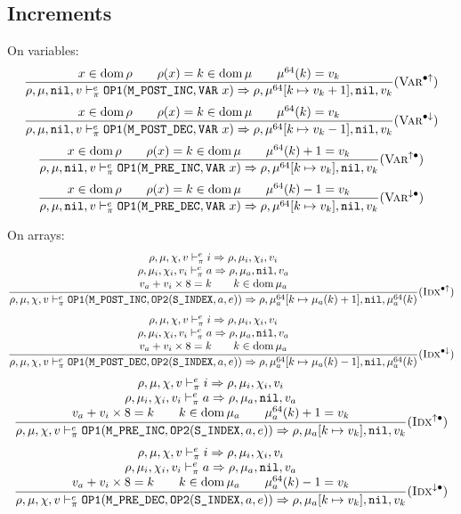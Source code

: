 \subsection{Increments}
On variables:
\[\dfrac{
    x\in\operatorname{dom}\rho \qquad \rho(x) = k \in\operatorname{dom}\mu \qquad \mu^{64}(k) = v_k
}{\rho,\mu,\texttt{nil},v \vdash_\pi^e \texttt{OP1}(\texttt{M\_POST\_INC}, \texttt{VAR}\ x) \Rightarrow \rho,\mu^{64}[k\mapsto v_k+1],\texttt{nil},v_k} (\textsc{Var}^{\bullet\uparrow})\]
\[\dfrac{
    x\in\operatorname{dom}\rho \qquad \rho(x) = k \in\operatorname{dom}\mu \qquad \mu^{64}(k) = v_k
}{\rho,\mu,\texttt{nil},v \vdash_\pi^e \texttt{OP1}(\texttt{M\_POST\_DEC}, \texttt{VAR}\ x) \Rightarrow \rho,\mu^{64}[k\mapsto v_k-1],\texttt{nil},v_k} (\textsc{Var}^{\bullet\downarrow})\]
\[\dfrac{
    x\in\operatorname{dom}\rho \qquad \rho(x) = k \in\operatorname{dom}\mu \qquad \mu^{64}(k)+1 = v_k
}{\rho,\mu,\texttt{nil},v \vdash_\pi^e \texttt{OP1}(\texttt{M\_PRE\_INC}, \texttt{VAR}\ x) \Rightarrow \rho,\mu^{64}[k\mapsto v_k],\texttt{nil},v_k} (\textsc{Var}^{\uparrow \bullet})\]
\[\dfrac{
    x\in\operatorname{dom}\rho \qquad \rho(x) = k \in\operatorname{dom}\mu \qquad \mu^{64}(k)-1 = v_k
}{\rho,\mu,\texttt{nil},v \vdash_\pi^e \texttt{OP1}(\texttt{M\_PRE\_DEC}, \texttt{VAR}\ x) \Rightarrow \rho,\mu^{64}[k\mapsto v_k],\texttt{nil},v_k} (\textsc{Var}^{\downarrow \bullet})\]

On arrays:
\[\dfrac{\begin{array}{c}
    \rho,\mu,\chi,v \vdash_\pi^e i\Rightarrow \rho,\mu_i,\chi_i,v_i \\
    \rho,\mu_i,\chi_i,v_i \vdash_\pi^e a\Rightarrow \rho,\mu_a,\texttt{nil},v_a \\
    v_a+v_i\times8 = k \qquad k\in\operatorname{dom}\mu_a
\end{array}}{\rho,\mu,\chi,v \vdash_\pi^e \texttt{OP1}(\texttt{M\_POST\_INC}, \texttt{OP2}(\texttt{S\_INDEX}, a, e)) \Rightarrow \rho,\mu_a^{64}[k \mapsto \mu_a(k)+1],\texttt{nil},\mu_a^{64}(k)}(\textsc{Idx}^{\bullet\uparrow})\]
\[\dfrac{\begin{array}{c}
    \rho,\mu,\chi,v \vdash_\pi^e i\Rightarrow \rho,\mu_i,\chi_i,v_i \\
    \rho,\mu_i,\chi_i,v_i \vdash_\pi^e a\Rightarrow \rho,\mu_a,\texttt{nil},v_a \\
    v_a+v_i\times8 = k \qquad k\in\operatorname{dom}\mu_a
\end{array}}{\rho,\mu,\chi,v \vdash_\pi^e \texttt{OP1}(\texttt{M\_POST\_DEC}, \texttt{OP2}(\texttt{S\_INDEX}, a, e)) \Rightarrow \rho,\mu_a^{64}[k \mapsto \mu_a(k)-1],\texttt{nil},\mu_a^{64}(k)}(\textsc{Idx}^{\bullet\downarrow})\]
\[\dfrac{\begin{array}{c}
    \rho,\mu,\chi,v \vdash_\pi^e i\Rightarrow \rho,\mu_i,\chi_i,v_i \\
    \rho,\mu_i,\chi_i,v_i \vdash_\pi^e a\Rightarrow \rho,\mu_a,\texttt{nil},v_a \\
    v_a+v_i\times8 = k \qquad k\in\operatorname{dom}\mu_a \qquad \mu_a^{64}(k)+1 = v_k
\end{array}}{\rho,\mu,\chi,v \vdash_\pi^e \texttt{OP1}(\texttt{M\_PRE\_INC}, \texttt{OP2}(\texttt{S\_INDEX}, a, e)) \Rightarrow \rho,\mu_a[k \mapsto v_k],\texttt{nil},v_k}(\textsc{Idx}^{\uparrow \bullet})\]
\[\dfrac{\begin{array}{c}
    \rho,\mu,\chi,v \vdash_\pi^e i\Rightarrow \rho,\mu_i,\chi_i,v_i \\
    \rho,\mu_i,\chi_i,v_i \vdash_\pi^e a\Rightarrow \rho,\mu_a,\texttt{nil},v_a \\
    v_a+v_i\times8 = k \qquad k\in\operatorname{dom}\mu_a \qquad \mu_a^{64}(k)-1 = v_k
\end{array}}{\rho,\mu,\chi,v \vdash_\pi^e \texttt{OP1}(\texttt{M\_PRE\_DEC}, \texttt{OP2}(\texttt{S\_INDEX}, a, e)) \Rightarrow \rho,\mu_a[k \mapsto v_k],\texttt{nil},v_k}(\textsc{Idx}^{\downarrow \bullet})\]

